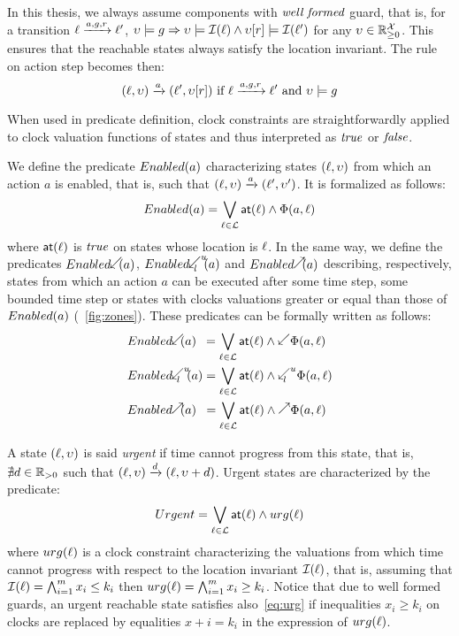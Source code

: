 In this thesis, we always assume components with $\emph{well formed}$
guard, that is, for a transition $\ell\xrightarrow{a,g,r}\ell'$,
$\upsilon\models g\Rightarrow\upsilon\models\mathcal{I}(\ell)\wedge\upsilon[r]\models
\mathcal{I}(\ell')$ for any $\upsilon\in\mathbb{R}_{\ge 0}^{\mathcal{X}}$. This ensures that the reachable states
always satisfy the location invariant. The rule on action step becomes then:
\begin{displaymath}
  (\ell,\upsilon)\xrightarrow{a}(\ell',\upsilon[r])\text{ if } \ell\xrightarrow{a,g,r}
      \ell'\text{ and } \upsilon\models g 
\end{displaymath}
\begin{remark}
  When used in predicate definition, clock constraints are straightforwardly 
  applied to clock valuation functions of states and thus interpreted as $\textnormal{\textit{true}}$
  or $\textnormal{\textit{false}}$.
\end{remark}
We define the predicate $Enabled(a)$ characterizing states $(\ell,\upsilon)$
from which an action $a$ is enabled, that is, such that $(\ell,\upsilon)
\xrightarrow{a}(\ell',\upsilon')$. It is formalized as follows:
\begin{displaymath}
  Enabled(a)=\bigvee_{\ell\in\mathcal{L}}\textsf{at}(\ell)\wedge\Phi(a,\ell)
\end{displaymath}
where $\textsf{at}(\ell)$ is $\textnormal{\textit{true}}$ on states whose location is $\ell$.
In the same way, we define the predicates $\enabledbackward{a}$,
$\enabledbackwardb{a}{l}{u}$ and $\enabledforward{a}$ describing, respectively,
states from which an action $a$ can be executed after some time step,
some bounded time step or states with clocks valuations greater or equal than those
of $Enabled(a)$ (~\ref{fig:zones}). These predicates can be formally written 
as follows:
\begin{align*}
  &\enabledbackward{a}\hspace{1.8mm}=\bigvee_{\loc\in\Loc}\al{\loc}\wedge
  \backward\Phi(a,\loc)  \\
  &\enabledbackwardb{a}{l}{u}=\bigvee_{\loc\in\Loc}\al{\loc}\wedge
  \backwardp{l}{u}\Phi(a,\loc)\\
  &\enabledforward{a}\hspace{1.9mm}=\bigvee_{\loc\in\Loc}\al{\loc}\wedge
  \forward\Phi(a,\loc)
\end{align*}

A state $(\ell,\upsilon)$ is said \emph{urgent} if time cannot progress from
this state, that is, $\nexists d\in\mathbb{R}_{> 0}$ such that $(\ell,\upsilon)\xrightarrow{d}
(\ell,\upsilon+d)$. Urgent states are characterized by the predicate:
\begin{equation}\label{eq:urg}
  Urgent=\bigvee_{\ell\in\mathcal{L}}\textsf{at}(\ell)\wedge urg(\ell)
\end{equation}
where $urg(\ell)$ is a clock constraint characterizing the valuations from
which time cannot progress with respect to the location invariant 
$\mathcal{I}(\ell)$, that is, assuming that 
$\mathcal{I}(\ell)=\bigwedge_{i=1}^m x_i\le k_i$ then 
$urg(\ell)=\bigwedge_{i=1}^m x_i\ge k_i$. Notice that due to well formed
guards, an urgent reachable state satisfies also~\ref{eq:urg} if inequalities
$x_i\ge k_i$ on clocks are replaced by equalities $x+i=k_i$ in the expression
of $urg(\ell)$.

